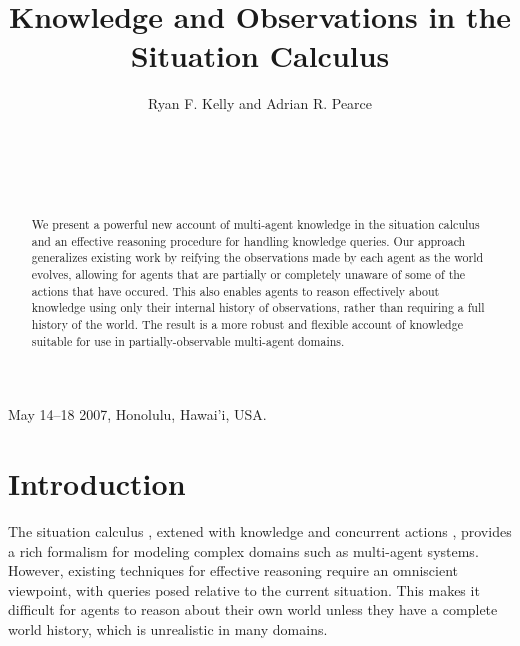 \documentclass{ifaamas-submission}
\begin{document}
 {May 14--18 2007, Honolulu, Hawai'i, USA.}

\title{Knowledge and Observations in the Situation Calculus}


\author{
\alignauthor
Ryan F. Kelly and Adrian R. Pearce\\
\\
\\
\\
\\
}

\maketitle

\begin{abstract}
We present a powerful new account of multi-agent knowledge in the
situation calculus and an effective reasoning procedure for handling
knowledge queries. Our approach generalizes existing work by reifying
the observations made by each agent as the world evolves, allowing
for agents that are partially or completely unaware of some of the
actions that have occured. This also enables agents to reason effectively
about knowledge using only their internal history of observations,
rather than requiring a full history of the world. The result is a
more robust and flexible account of knowledge suitable for use in
partially-observable multi-agent domains. 
\end{abstract}




\section{Introduction}

The situation calculus \cite{pirri99contributions_sitcalc},
 extened with knowledge \cite{scherl03sc_knowledge} and concurrent actions
\cite{scherl03conc_knowledge}, provides a rich formalism for modeling complex
domains such as multi-agent systems.  However, existing techniques for
effective reasoning require an omniscient viewpoint, with queries posed
relative to the current situation.
This makes it difficult for agents to reason about their own world
unless they have a complete world history, which is unrealistic in many domains.
\end{document}

